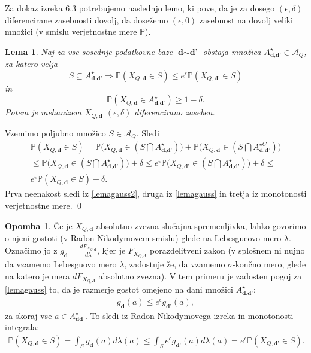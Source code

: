 \documentclass[12pt,a4paper]{amsart}
\theoremstyle{definition} %
\newtheorem{opomba}[definicija]{Opomba}
\theoremstyle{plain} %
\newtheorem{lema}[definicija]{Lema}
\begin{document}
Za dokaz izreka 6.3 potrebujemo naslednjo lemo, ki pove, da je za dosego $(\epsilon, \delta)$ diferencirane zasebnosti dovolj, da dosežemo $(\epsilon, 0)$ zasebnost na dovolj veliki množici (v smislu verjetnostne mere $\mathbb{P}$).
\begin{lema}
Naj za vse sosednje podatkovne baze $\textbf{d} \sim \textbf{d'}$ obstaja množica $A_{\textbf{d}, \textbf{d'}}^{\star} \in \mathcal{A}_Q$, za katero velja
\begin{equation}\label{lemagauss}
S \subseteq A_{\textbf{d}, \textbf{d'}}^{\star} \Rightarrow \mathbb{P}(X_{Q, \textbf{d}} \in S) \leq e^{\epsilon} \mathbb{P}(X_{Q, \textbf{d'}} \in S) \tag{8}
\end{equation}
in 
\begin{equation}\label{lemagauss2}
\mathbb{P}(X_{Q, \textbf{d}} \in A_{\textbf{d}, \textbf{d'}}^{\star}) \geq 1 - \delta. \tag{9}
\end{equation}
Potem je mehanizem $X_{Q, \textbf{d}}$ $(\epsilon, \delta)$ diferencirano zaseben.
\end{lema}
\proof 
Vzemimo poljubno množico $S \in \mathcal{A}_Q$. Sledi
\begin{gather*}
\mathbb{P}(X_{Q, \textbf{d}} \in S)  = \mathbb{P}\Big(X_{Q, \textbf{d}} \in (S \bigcap A_{\textbf{d}, \textbf{d'}}^{\star}) \Big)  + \mathbb{P}\Big(X_{Q, \textbf{d}} \in ( S \bigcap A_{\textbf{d}, \textbf{d'}}^{\star C} ) \Big) \\ \leq \mathbb{P}\Big(X_{Q, \textbf{d}} \in (S \bigcap A_{\textbf{d}, \textbf{d'}}^{\star}) \Big)  + \delta \leq e^{\epsilon} \mathbb{P}\Big(X_{Q, \textbf{d'}} \in (S \bigcap A_{\textbf{d}, \textbf{d'}}^{\star}) \Big)  + \delta \leq \\ e^{\epsilon} \mathbb{P}(X_{Q, \textbf{d}} \in S )  + \delta.
\end{gather*}
Prva neenakost sledi iz \eqref{lemagauss2}, druga iz \eqref{lemagauss} in tretja iz monotonosti verjetnostne mere.
\qed
\newline
\begin{opomba}
Če je $X_{Q, \textbf{d}}$ absolutno zvezna slučajna spremenljivka, lahko govorimo o njeni gostoti (v Radon-Nikodymovem smislu) glede na Lebesgueovo mero $\lambda$. Označimo jo z $g_{\textbf{d}} = \frac{dF_{X_{Q, \textbf{d}}}}{d \lambda}$, kjer je $F_{X_{Q, \textbf{d}}}$ porazdelitveni zakon (v splošnem ni nujno da vzamemo Lebesguovo mero $\lambda$, zadostuje že, da vzamemo $\sigma$-končno mero, glede na katero je mera $dF_{X_{Q, \textbf{d}}}$ absolutno zvezna). V tem primeru je zadosten pogoj za \eqref{lemagauss} to, da je razmerje gostot omejeno na dani množici $A_{\textbf{d}, \textbf{d'}}^{\star}$:
\begin{gather*}
  g_{\textbf{d}} (a) \leq e^{\epsilon} g_{\textbf{d'}} (a),
\end{gather*}
za skoraj vse $ a \in A_{\textbf{d}\textbf{d'}}^{\star}$.
To sledi iz Radon-Nikodymovega izreka in monotonosti integrala:
\begin{gather*}
\mathbb{P}(X_{Q, \textbf{d}} \in S) = \int_{S} g_{\textbf{d}}(a) d\lambda(a) \leq \int_{S} e^{\epsilon} g_{\textbf{d'}}(a) d\lambda(a) = e^{\epsilon} \mathbb{P}(X_{Q, \textbf{d'}} \in S).
\end{gather*}
\end{opomba}
\end{document}
